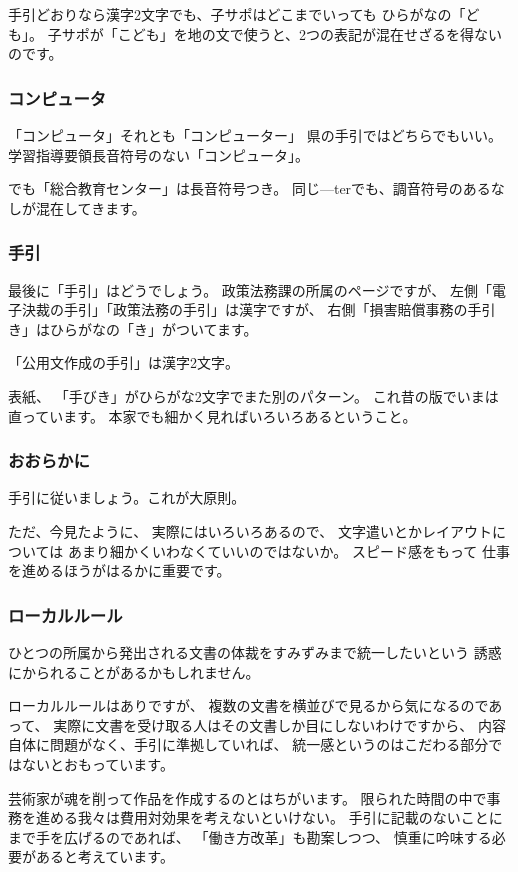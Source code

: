 \documentclass[uplatex,jis2004,dvipdfmx,12pt]{jsarticle}
\begin{document}
手引どおりなら漢字2文字でも、子サポはどこまでいっても
ひらがなの「ども」。
子サポが「こども」を地の文で使うと、2つの表記が混在せざるを得ないのです。

\subsubsection{コンピュータ}
「コンピュータ」それとも「コンピューター」
県の手引ではどちらでもいい。
学習指導要領長音符号のない「コンピュータ」。

でも「総合教育センター」は長音符号つき。
同じ---terでも、調音符号のあるなしが混在してきます。

\subsubsection{手引}
最後に「手引」はどうでしょう。
政策法務課の所属のページですが、
左側「電子決裁の手引」「政策法務の手引」は漢字ですが、
右側「損害賠償事務の手引き」はひらがなの「き」がついてます。

「公用文作成の手引」は漢字2文字。


表紙、
「手びき」がひらがな2文字でまた別のパターン。
これ昔の版でいまは直っています。
本家でも細かく見ればいろいろあるということ。


\subsubsection{おおらかに}
手引に従いましょう。これが大原則。

ただ、今見たように、
実際にはいろいろあるので、
文字遣いとかレイアウトについては
あまり細かくいわなくていいのではないか。
スピード感をもって
仕事を進めるほうがはるかに重要です。


\subsubsection{ローカルルール}

ひとつの所属から発出される文書の体裁をすみずみまで統一したいという
誘惑にかられることがあるかもしれません。

ローカルルールはありですが、
複数の文書を横並びで見るから気になるのであって、
実際に文書を受け取る人はその文書しか目にしないわけですから、
内容自体に問題がなく、手引に準拠していれば、
統一感というのはこだわる部分ではないとおもっています。

芸術家が魂を削って作品を作成するのとはちがいます。
限られた時間の中で事務を進める我々は費用対効果を考えないといけない。
手引に記載のないことにまで手を広げるのであれば、
「働き方改革」も勘案しつつ、
慎重に吟味する必要があると考えています。
\end{document}
